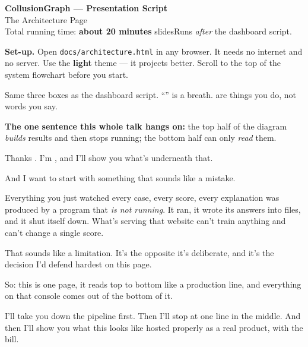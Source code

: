 \documentclass[11pt]{article}
\begin{document}
\begin{center}
{\LARGE\bfseries CollusionGraph --- Presentation Script}\\[4pt]
{\large The Architecture Page}\\[8pt]
{\small Total running time: \textbf{about 20 minutes}\quad\textbar{} slides\quad\textbar\quad Runs \emph{after} the dashboard script.}
\end{center}

\vspace{6pt}
\begin{tcolorbox}[colback=metagrey!6,colframe=metagrey!45,boxrule=0.6pt,arc=1pt]
\textbf{Set-up.} Open \texttt{docs/architecture.html} in any browser. It needs
no internet and no server. Use the \textbf{light} theme --- it projects better.
Scroll to the top of the system flowchart before you start.

Same three boxes as the dashboard script. ``\bt'' is a breath.
 are things you do, not words you say.

\textbf{The one sentence this whole talk hangs on:} the top half of the diagram
\emph{builds} results and then stops running; the bottom half can only
\emph{read} them.
\end{tcolorbox}



\begin{saythis}
Thanks \blank. I'm \blank, and I'll show you what's underneath that.

And I want to start with something that sounds like a mistake.

Everything you just watched \bt every case, every score, every explanation \bt
was produced by a program that \emph{is not running}. It ran, it wrote its
answers into files, and it shut itself down. What's serving that website can't
train anything and can't change a single score.

That sounds like a limitation. It's the opposite \bt it's deliberate, and it's
the decision I'd defend hardest on this page.

So: this is one page, it reads top to bottom like a production line, and
everything on that console comes out of the bottom of it.

I'll take you down the pipeline first. Then I'll stop at one line in the
middle. And then I'll show you what this looks like hosted properly as a real
product, with the bill.
\end{saythis}
\end{document}
